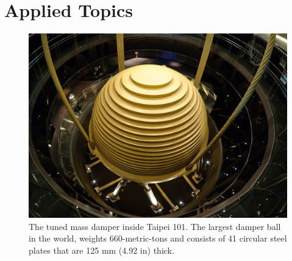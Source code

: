\documentclass[12pt,letter]{article}
\begin{document}
\pagebreak

\graphicspath{{Chapter_1_fundamentals_of_vibrations/}} 










\part{Applied Topics}

\begin{figure}[H]
	\centering
	\includegraphics[width=6.5in]{figures/Taipei_101_Tuned_Mass_Damper_picture} \\
	The tuned mass damper inside Taipei 101.  The largest damper ball in the world, weights 660-metric-tons and consists of 41 circular steel plates that are 125 mm (4.92 in) thick.  \protect\footnotemark[1]
\end{figure}

\end{document}
